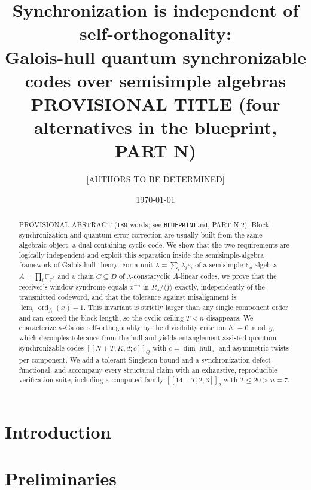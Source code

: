 \documentclass[11pt]{article}
\title{\textbf{Synchronization is independent of self-orthogonality:\\
Galois-hull quantum synchronizable codes over semisimple algebras}\\[4pt]
\large PROVISIONAL TITLE (four alternatives in the blueprint, PART N)}
\author{[AUTHORS TO BE DETERMINED]}
\date{\today}
\theoremstyle{definition}
\theoremstyle{remark}
\theoremstyle{plain}
\newcommand{\Fq}{\mathbb{F}_q}
\newcommand{\Fqi}{\mathbb{F}_{q^{d_i}}}
\newcommand{\Aalg}{A}
\newcommand{\Rlam}{R_{\lambda}}
\newcommand{\hull}{\operatorname{hull}}
\newcommand{\ord}{\operatorname{ord}}
\newcommand{\lcm}{\operatorname{lcm}}
\newcommand{\Tol}{T}
\begin{document}
\maketitle

\begin{abstract}
\noindent
PROVISIONAL ABSTRACT (189 words; see \texttt{BLUEPRINT.md}, PART N.2).
Block synchronization and quantum error correction are usually built from the same
algebraic object, a dual-containing cyclic code. We show that the two requirements are
logically independent and exploit this separation inside the semisimple-algebra framework
of Galois-hull theory. For a unit $\lambda=\sum_i\lambda_ie_i$ of a semisimple
$\Fq$-algebra $\Aalg=\prod_i\Fqi$ and a chain $C\subseteq D$ of $\lambda$-constacyclic
$\Aalg$-linear codes, we prove that the receiver's window syndrome equals $x^{-a}$ in
$\Rlam/\langle f\rangle$ exactly, independently of the transmitted codeword, and that the
tolerance against misalignment is $\lcm_i\ord_{f_i}(x)-1$. This invariant is strictly
larger than any single component order and can exceed the block length, so the cyclic
ceiling $\Tol<n$ disappears. We characterize $\kappa$-Galois self-orthogonality by the
divisibility criterion $h^\tau\equiv0\bmod g$, which decouples tolerance from the hull and
yields entanglement-assisted quantum synchronizable codes $[[N+\Tol,K,d;c]]_Q$ with
$c=\dim\hull_\kappa$ and asymmetric twists per component. We add a tolerant Singleton bound
and a synchronization-defect functional, and accompany every structural claim with an
exhaustive, reproducible verification suite, including a computed family
$[[14+\Tol,2,3]]_2$ with $\Tol\le20>n=7$.
\end{abstract}

\section{Introduction}\label{sec:intro}

\section{Preliminaries}\label{sec:prelim}
\end{document}

